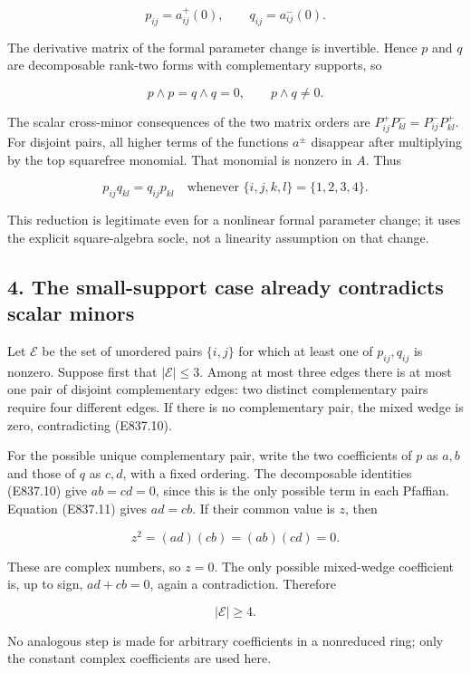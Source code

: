 \[
 p_{ij}=a^+_{ij}(0),\qquad q_{ij}=a^-_{ij}(0).
 \tag{E837.9}
\]

The derivative matrix of the formal parameter change is invertible.
Hence \(p\) and \(q\) are decomposable rank-two forms with complementary
supports, so

\[
 p\wedge p=q\wedge q=0,
 \qquad p\wedge q\ne0.
 \tag{E837.10}
\]

The scalar cross-minor consequences of the two matrix orders are
\(P^+_{ij}P^-_{kl}=P^-_{ij}P^+_{kl}\). For disjoint pairs, all higher
terms of the functions \(a^\pm\) disappear after multiplying by the top
squarefree monomial. That monomial is nonzero in \(A\). Thus

\[
 p_{ij}q_{kl}=q_{ij}p_{kl}
       \quad\text{whenever }\{i,j,k,l\}=\{1,2,3,4\}.
 \tag{E837.11}
\]

This reduction is legitimate even for a nonlinear formal parameter
change; it uses the explicit square-algebra socle, not a linearity
assumption on that change.

\subsection{4. The small-support case already contradicts scalar
minors}\label{the-small-support-case-already-contradicts-scalar-minors}

Let \(\mathcal E\) be the set of unordered pairs \(\{i,j\}\) for which
at least one of \(p_{ij},q_{ij}\) is nonzero. Suppose first that
\(|\mathcal E|\le3\). Among at most three edges there is at most one
pair of disjoint complementary edges: two distinct complementary pairs
require four different edges. If there is no complementary pair, the
mixed wedge is zero, contradicting (E837.10).

For the possible unique complementary pair, write the two coefficients
of \(p\) as \(a,b\) and those of \(q\) as \(c,d\), with a fixed
ordering. The decomposable identities (E837.10) give \(ab=cd=0\), since
this is the only possible term in each Pfaffian. Equation (E837.11)
gives \(ad=cb\). If their common value is \(z\), then

\[
 z^2=(ad)(cb)=(ab)(cd)=0.
 \tag{E837.12}
\]

These are complex numbers, so \(z=0\). The only possible mixed-wedge
coefficient is, up to sign, \(ad+cb=0\), again a contradiction.
Therefore

\[
 |\mathcal E|\ge4.
 \tag{E837.13}
\]

No analogous step is made for arbitrary coefficients in a nonreduced
ring; only the constant complex coefficients are used here.

